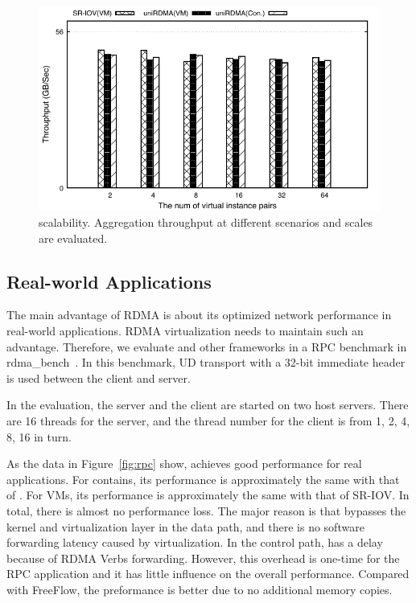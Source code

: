 \begin{figure}[!ht]
	\centering
	\includegraphics[width=1.0\linewidth]{images/scabality.pdf}
	\caption{\sys scalability. Aggregation throughput at different scenarios and scales are evaluated.}
	\label{fig:scabality}
\end{figure}

\subsection{Real-world Applications}

The main advantage of RDMA is about its optimized network performance in real-world applications. RDMA virtualization needs to maintain such an advantage. Therefore, we evaluate \sys and other frameworks in a RPC benchmark in rdma\_bench~\cite{rbench}. In this benchmark, UD transport with a 32-bit immediate header is used between the client and server.

In the evaluation, the server and the client are started on two host servers. There are 16 threads for the server, and the thread number for the client is from 1, 2, 4, 8, 16 in turn. %

As the data in Figure~\ref{fig:rpc} show, \sys achieves good performance for real applications. For contains, its performance is approximately the same with that of \native. For VMs, its performance is approximately the same with that of SR-IOV. In total, there is almost no performance loss. The major reason is that \sys bypasses the kernel and virtualization layer in the data path, and there is no software forwarding latency caused by virtualization. In the control path, \sys has a delay because of RDMA Verbs forwarding. However, this overhead is one-time for the RPC application and it has little influence on the overall performance. Compared with FreeFlow, the preformance \sys is better due to no additional memory copies. 

